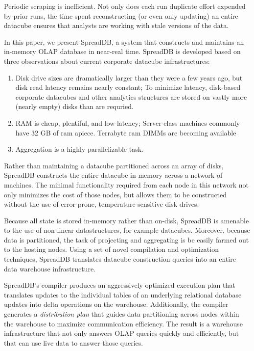 \documentclass{sig-alternate}
\begin{document}
Periodic scraping is inefficient.  Not only does each run duplicate effort expended by prior runs, the time spent reconstructing (or even only updating) an entire datacube ensures that analysts are working with stale versions of the data.  

In this paper, we present SpreadDB, a system that constructs and maintains an in-memory OLAP database in near-real time.  SpreadDB is developed based on three observations about current corporate datacube infrastructures:
\begin{enumerate}
\item Disk drive sizes are dramatically larger than they were a few years ago, but disk read latency remains nearly constant\cite{}; To minimize latency, disk-based corporate datacubes and other analytics structures are stored on vastly more (nearly empty) disks than are requried.\cite{}
\item RAM is cheap, plentiful, and low-latency; Server-class machines commonly have 32 GB of ram apiece\cite{}.  Terrabyte ram DIMMs are becoming available\cite{}
\item Aggregation is a highly parallelizable task.
\end{enumerate}

Rather than maintaining a datacube partitioned across an array of disks, SpreadDB constructs the entire datacube in-memory across a network of machines.  The minimal functionality required from each node in this network not only minimizes the cost of those nodes, but allows them to be constructed without the use of error-prone, temperature-sensitive disk drives.  

Because all state is stored in-memory rather than on-disk, SpreadDB is amenable to the use of non-linear datastructures, for example datacubes.  Moreover, because data is partitioned, the task of projecting and aggregating is be easily farmed out to the hosting nodes.  Using a set of novel compilation and optimization techniques, SpreadDB translates datacube construction queries into an entire data warehouse infrastructure.  

SpreadDB's compiler produces an aggressively optimized execution plan that translates updates to the individual tables of an underlying relational database updates into delta operations on the warehouse.  Additionally, the compiler generates a \textit{distribution plan} that guides data partitioning across nodes within the warehouse to maximize communication efficiency.  The result is a warehouse infrastructure that not only answers OLAP queries quickly and efficiently, but that can use live data to answer those queries.
\end{document}
